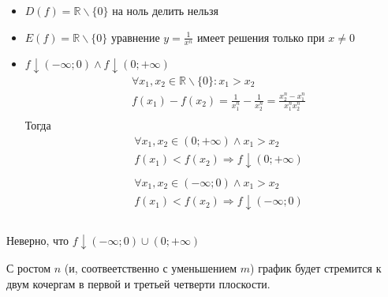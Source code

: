 \begin{itemize}
    \item $D(f) = \mathbb{R} \backslash \{0\}$
    на ноль делить нельзя
    \item $E(f) = \mathbb{R} \backslash \{0\}$
    уравнение $y = \frac{1}{x^n}$ имеет решения только при $x \neq 0$ 
    \item $f \downarrow (-\infty; 0) \land f \downarrow (0; +\infty)$
    \begin{align*}
        &\forall x_1, x_2 \in \mathbb{R} \backslash \{0\}: x_1 > x_2 \\
        &f(x_1) - f(x_2) = \frac{1}{x_1^n} - \frac{1}{x_2^n} = \frac{x_2^n - x_1^n}{x_1^n x_2^n}\\
    \end{align*}
    Тогда
    \begin{align*}
        &\forall x_1, x_2 \in (0; +\infty) \land x_1 > x_2 \\
        &f(x_1) < f(x_2) \Rightarrow f \downarrow (0; +\infty) \\ \\
        &\forall x_1, x_2 \in (-\infty; 0) \land x_1 > x_2 \\
        &f(x_1) < f(x_2) \Rightarrow f \downarrow (-\infty; 0) \\ \\
    \end{align*}
\end{itemize}

\begin{remark}
    Неверно, что $f \downarrow (-\infty; 0) \cup (0; +\infty)$
\end{remark}

\begin{remark}
    С ростом $n$ (и, соотвеетственно с уменьшением $m$) график будет стремится к двум кочергам в первой и третьей четверти плоскости.
\end{remark}

